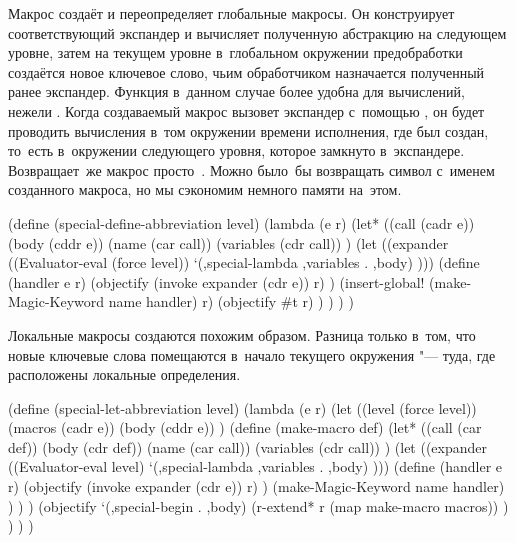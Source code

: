 Макрос  создаёт и переопределяет глобальные макросы. Он
конструирует соответствующий экспандер и вычисляет полученную абстракцию на
следующем уровне, затем на текущем уровне в~глобальном окружении предобработки
создаётся новое ключевое слово, чьим обработчиком назначается полученный ранее
экспандер. Функция  в~данном случае более удобна для вычислений,
нежели . Когда создаваемый макрос вызовет экспандер с~помощью
, он будет проводить вычисления в~том окружении времени исполнения,
где был создан, то~есть в~окружении следующего уровня, которое замкнуто
в~экспандере. Возвращает~же макрос  просто~.
Можно было~бы возвращать символ с~именем созданного макроса, но мы сэкономим
немного памяти на~этом.

\begin{code:lisp}
(define (special-define-abbreviation level)
  (lambda (e r)
    (let* ((call      (cadr e))
           (body      (cddr e))
           (name      (car call))
           (variables (cdr call)) )
      (let ((expander ((Evaluator-eval (force level))
                       `(,special-lambda ,variables . ,body) )))
        (define (handler e r)
          (objectify (invoke expander (cdr e)) r) )
        (insert-global! (make-Magic-Keyword name handler) r)
        (objectify #t r) ) ) ) )
\end{code:lisp}

Локальные макросы создаются похожим образом. Разница только в~том, что
новые ключевые слова помещаются в~начало текущего окружения "--- туда, где
расположены локальные определения.

\begin{code:lisp}
(define (special-let-abbreviation level)
  (lambda (e r)
    (let ((level  (force level))
          (macros (cadr e))
          (body   (cddr e)) )
      (define (make-macro def)
        (let* ((call      (car def))
               (body      (cdr def))
               (name      (car call))
               (variables (cdr call)) )
          (let ((expander ((Evaluator-eval level)
                           `(,special-lambda ,variables . ,body) )))
            (define (handler e r)
              (objectify (invoke expander (cdr e)) r) )
            (make-Magic-Keyword name handler) ) ) )
      (objectify `(,special-begin . ,body)
                 (r-extend* r (map make-macro macros)) ) ) ) )
\end{code:lisp}

